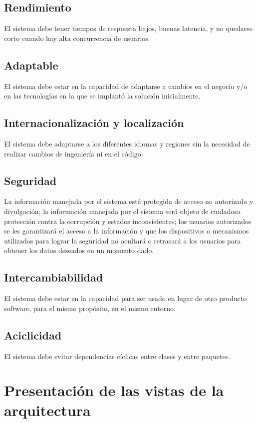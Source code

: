 \documentclass{article}
\begin{document}
\subsection{Rendimiento}
El sistema debe tener tiempos de respuesta bajos, buenas latencia, y no quedarse corto cuando hay alta concurrencia de usuarios.

\subsection{Adaptable}
El sistema debe estar en la capacidad de adaptarse a cambios en el negocio y/o en las tecnologías en la que se implantó la solución inicialmente.

\subsection{Internacionalización y localización}
El sistema debe adaptarse a los diferentes idiomas y regiones sin la necesidad de realizar cambios de ingeniería ni en el código.

\subsection{Seguridad} 
La información manejada por el sistema está protegida de acceso no autorizado y divulgación; la información manejada por el sistema será objeto de cuidadosa protección contra la corrupción y estados inconsistentes; los usuarios autorizados se les garantizará el acceso a la información y que los dispositivos o mecanismos utilizados para lograr la seguridad no ocultará o retrasará a los usuarios para obtener los datos deseados en un momento dado. 

\subsection{Intercambiabilidad}
El sistema debe estar en la capacidad para ser usado en lugar de otro producto software, para el mismo propósito, en el mismo entorno.

\subsection{Aciclicidad}
El sistema debe evitar dependencias cíclicas entre clases y entre paquetes.

\newpage
\section{Presentación de las vistas de la arquitectura}
\end{document}
